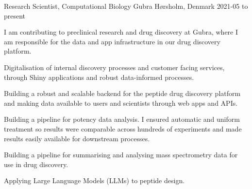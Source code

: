 


\begin{cventries}


\cventry
{Research Scientist, Computational Biology}
{Gubra}
{Hørsholm, Denmark}
{2021-05 to present}
{
\begin{cvitems}
\item {I am contributing to preclinical research and drug discovery at Gubra, where I am responsible for the data and app infrastructure in our drug discovery platform.}
\item {Digitalisation of internal discovery processes and customer facing services, through Shiny applications and robust data-informed processes.}
\item {Building a robust and scalable backend for the peptide drug discovery platform and making data available to users and scientists through web apps and APIs.}
\item {Building a pipeline for potency data analysis. I ensured automatic and uniform treatment so results were comparable across hundreds of experiments and made results easily available for downstream processes.}
\item {Building a pipeline for summarising and analysing mass spectrometry data for use in drug discovery.}
\item {Applying Large Language Models (LLMs) to peptide design.}
\end{cvitems}
}


\end{cventries}

